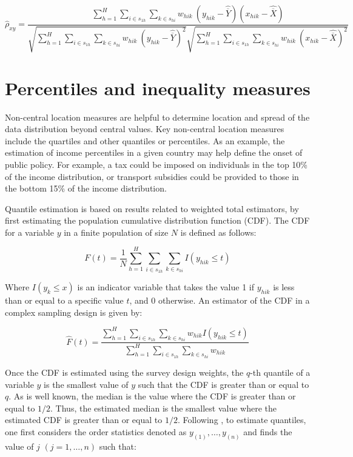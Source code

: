 \documentclass[
  12pt,
]{book}
\begin{document}
\[
\widehat{\rho}_{xy} = \frac {\sum_{h=1}^{H}\sum_{i \in s_{1h}} \sum_{ k \in s_{hi}}  w_{hik} \ \left( y_{hik} - \widehat{\overline{Y}} \right) \left( x_{hik} - \widehat{\overline{X}} \right)} {\sqrt{\sum_{h=1}^{H}\sum_{i \in s_{1h}} \sum_{ k \in s_{hi}}  w_{hik} \ \left( y_{hik} - \widehat{\overline{Y}} \right)^2} \sqrt{\sum_{h=1}^{H}\sum_{i \in s_{1h}} \sum_{ k \in s_{hi}}  w_{hik} \ \left( x_{hik} - \widehat{\overline{X}} \right)^2}}
\]

\hypertarget{percentiles-and-inequality-measures}{%
\section{Percentiles and inequality measures}\label{percentiles-and-inequality-measures}}

Non-central location measures are helpful to determine location and spread of the data distribution beyond central values. Key non-central location measures include the quartiles and other quantiles or percentiles. As an example, the estimation of income percentiles in a given country may help define the onset of public policy. For example, a tax could be imposed on individuals in the top 10\% of the income distribution, or transport subsidies could be provided to those in the bottom 15\% of the income distribution.

Quantile estimation is based on results related to weighted total estimators, by first estimating the population cumulative distribution function (CDF). The CDF for a variable \(y\) in a finite population of size \(N\) is defined as follows:

\[
F(t) = \frac{1}{N}\sum_{h=1}^{H}\sum_{i \in s_{1h}} \sum_{ k \in s_{hi}}  I(y_{hik} \leq t) 
\]

Where \(I(y_k \leq x)\) is an indicator variable that takes the value 1 if \(y_{hik}\) is less than or equal to a specific value \(t\), and 0 otherwise. An estimator of the CDF in a complex sampling design is given by:

\[
\widehat{F}(t) = \frac{\sum_{h=1}^{H}\sum_{i \in s_{1h}} \sum_{ k \in s_{hi}} w_{hik} I(y_{hik}\leq t)}{\sum_{h=1}^{H}\sum_{i \in s_{1h}} \sum_{ k \in s_{hi}} w_{hik}}
\]

Once the CDF is estimated using the survey design weights, the \(q\)-th quantile of a variable \(y\) is the smallest value of \(y\) such that the CDF is greater than or equal to \(q\). As is well known, the median is the value where the CDF is greater than or equal to \(1/2\). Thus, the estimated median is the smallest value where the estimated CDF is greater than or equal to \(1/2\). Following \citet{Heeringa2017}, to estimate quantiles, one first considers the order statistics denoted as \(y_{(1)}, \ldots, y_{(n)}\) and finds the value of \(j\) \((j=1, \ldots, n)\) such that:
\end{document}
